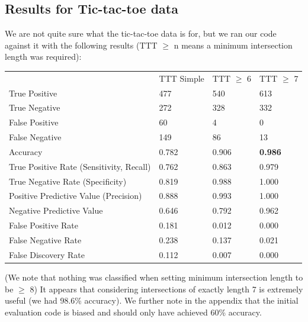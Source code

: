 \documentclass[12pt, a4, epsf] {article}
\theoremstyle{plain}
\theoremstyle{definition}
\begin{document}
\subsection*{Results for Tic-tac-toe data}
We are not quite sure what the tic-tac-toe data is for, but we ran our code against it with the following results (TTT $\geq$ n means a minimum intersection length was required):\\
\begin{table}[htbp]
\begin{tabular}{llll}
                                         & TTT Simple & TTT $\geq$ 6 & TTT $\geq$ 7 \\
True Positive                            & 477        & 540                  & 613                  \\
True Negative                            & 272        & 328                  & 332                  \\
False Positive                           & 60         & 4                    & 0                    \\
False Negative                           & 149        & 86                   & 13                   \\
Accuracy                                 & 0.782      & 0.906                & \textbf{0.986               } \\
True Positive Rate (Sensitivity, Recall) & 0.762      & 0.863                & 0.979                \\
True Negative Rate (Specificity)         & 0.819      & 0.988                & 1.000                \\
Positive Predictive Value (Precision)    & 0.888      & 0.993                & 1.000                \\
Negative Predictive Value                & 0.646      & 0.792                & 0.962                \\
False Positive Rate                      & 0.181      & 0.012                & 0.000                \\
False Negative Rate                      & 0.238      & 0.137                & 0.021                \\
False Discovery Rate                     & 0.112      & 0.007                & 0.000               
\end{tabular}
\end{table}
\FloatBarrier
(We note that nothing was classified when setting minimum intersection length to be $\geq$ 8)
It appears that considering intersections of exactly length 7 is extremely useful (we had 98.6\% accuracy). We further note in the appendix that the initial evaluation code is biased and should only have achieved 60\% accuracy.
\end{document}
